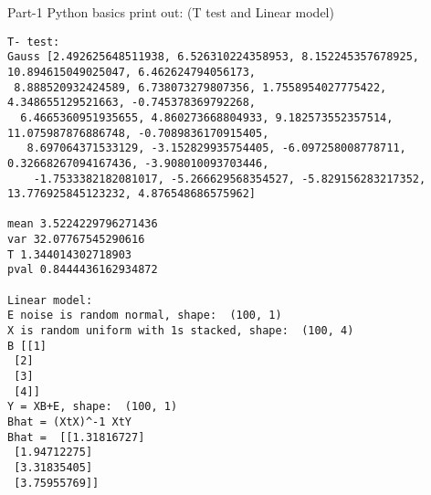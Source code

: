 \documentclass[11pt,a4paper]{article}
\begin{document}
Part-1 Python basics print out: (T test and Linear model)\\
\scriptsize
\begin{verbatim}
T- test: 
Gauss [2.492625648511938, 6.526310224358953, 8.152245357678925, 10.894615049025047, 6.462624794056173,
 8.888520932424589, 6.738073279807356, 1.7558954027775422, 4.348655129521663, -0.745378369792268,
  6.4665360951935655, 4.860273668804933, 9.182573552357514, 11.075987876886748, -0.7089836170915405,
   8.697064371533129, -3.152829935754405, -6.097258008778711, 0.32668267094167436, -3.908010093703446,
    -1.7533382182081017, -5.266629568354527, -5.829156283217352, 13.776925845123232, 4.876548686575962]
    
mean 3.5224229796271436
var 32.07767545290616
T 1.344014302718903
pval 0.8444436162934872

Linear model:
E noise is random normal, shape:  (100, 1)
X is random uniform with 1s stacked, shape:  (100, 4)
B [[1]
 [2]
 [3]
 [4]]
Y = XB+E, shape:  (100, 1)
Bhat = (XtX)^-1 XtY
Bhat =  [[1.31816727]
 [1.94712275]
 [3.31835405]
 [3.75955769]]

\end{verbatim}
 
 
 \normalsize
 
\end{document}
